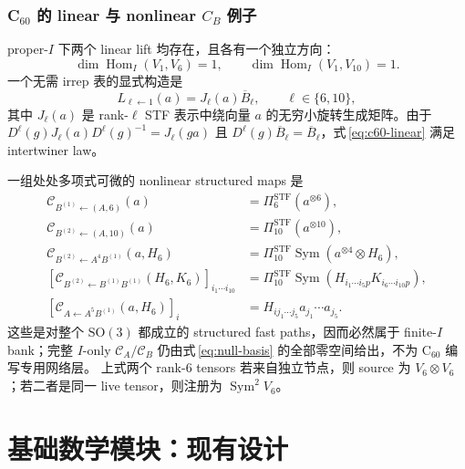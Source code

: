\documentclass[11pt,a4paper,fontset=fandol]{ctexart}
\newcommand{\SO}{\mathrm{SO}}
\newcommand{\Sym}{\operatorname{Sym}}
\newcommand{\Hom}{\operatorname{Hom}}
\newcommand{\cA}{\mathcal C_A}
\newcommand{\cB}{\mathcal C_B}
\newcommand{\PiSTF}[1]{\Pi_{#1}^{\mathrm{STF}}}
\begin{document}
\subsubsection{C$_{60}$ 的 linear 与 nonlinear $C_B$ 例子}

proper-$I$ 下两个 linear lift 均存在，且各有一个独立方向：
\begin{equation}
  \dim\Hom_I(V_1,V_6)=1,
  \qquad
  \dim\Hom_I(V_1,V_{10})=1.
\end{equation}
一个无需 irrep 表的显式构造是
\begin{equation}
  L_{\ell\leftarrow1}(a)=J_\ell(a)\overline B_\ell,
  \qquad \ell\in\{6,10\},
  \label{eq:c60-linear}
\end{equation}
其中 $J_\ell(a)$ 是 rank-$\ell$ STF 表示中绕向量 $a$ 的无穷小旋转生成矩阵。由于
$D^\ell(g)J_\ell(a)D^\ell(g)^{-1}=J_\ell(ga)$ 且 $D^\ell(g)\overline B_\ell=\overline B_\ell$，式\,\eqref{eq:c60-linear} 满足 intertwiner law。

一组处处多项式可微的 nonlinear structured maps 是
\begin{align}
  \mathcal C_{B^{(1)}\leftarrow(A,6)}(a)
  &=\PiSTF{6}(a^{\otimes6}),\\
  \mathcal C_{B^{(2)}\leftarrow(A,10)}(a)
  &=\PiSTF{10}(a^{\otimes10}),\\
  \mathcal C_{B^{(2)}\leftarrow A^4B^{(1)}}(a,H_6)
  &=\PiSTF{10}\Sym(a^{\otimes4}\otimes H_6),\\
  [\mathcal C_{B^{(2)}\leftarrow B^{(1)}B^{(1)}}(H_6,K_6)]_{i_1\cdots i_{10}}
  &=\PiSTF{10}\Sym\!\left(
  H_{i_1\cdots i_5p}K_{i_6\cdots i_{10}p}
  \right),\\
  [\mathcal C_{A\leftarrow A^5B^{(1)}}(a,H_6)]_i
  &=H_{ij_1\cdots j_5}a_{j_1}\cdots a_{j_5}.
  \label{eq:c60-maps}
\end{align}
这些是对整个 $\SO(3)$ 都成立的 structured fast paths，因而必然属于 finite-$I$ bank；完整 $I$-only $\cA/\cB$ 仍由式\,\eqref{eq:null-basis} 的全部零空间给出，不为 C$_{60}$ 编写专用网络层。
上式两个 rank-$6$ tensors 若来自独立节点，则 source 为 $V_6\otimes V_6$；若二者是同一 live tensor，则注册为 $\Sym^2V_6$。

\section{基础数学模块：现有设计}
\end{document}
